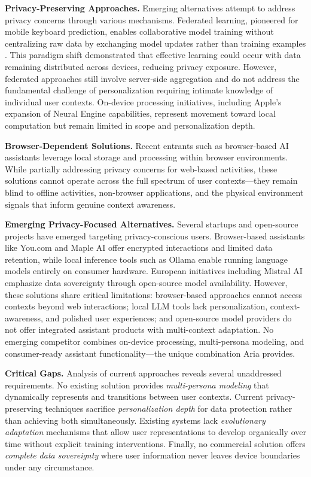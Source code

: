 \documentclass[11pt]{article}
\begin{document}
\textbf{Privacy-Preserving Approaches.} Emerging alternatives attempt to address privacy concerns through various mechanisms. Federated learning, pioneered for mobile keyboard prediction, enables collaborative model training without centralizing raw data by exchanging model updates rather than training examples \cite{mcmahan2017communication}. This paradigm shift demonstrated that effective learning could occur with data remaining distributed across devices, reducing privacy exposure. However, federated approaches still involve server-side aggregation and do not address the fundamental challenge of personalization requiring intimate knowledge of individual user contexts. On-device processing initiatives, including Apple's expansion of Neural Engine capabilities, represent movement toward local computation but remain limited in scope and personalization depth.

\textbf{Browser-Dependent Solutions.} Recent entrants such as browser-based AI assistants leverage local storage and processing within browser environments. While partially addressing privacy concerns for web-based activities, these solutions cannot operate across the full spectrum of user contexts---they remain blind to offline activities, non-browser applications, and the physical environment signals that inform genuine context awareness.

\textbf{Emerging Privacy-Focused Alternatives.} Several startups and open-source projects have emerged targeting privacy-conscious users. Browser-based assistants like You.com and Maple AI offer encrypted interactions and limited data retention, while local inference tools such as Ollama enable running language models entirely on consumer hardware. European initiatives including 
Mistral AI emphasize data sovereignty through open-source model availability. 
However, these solutions share critical limitations: browser-based approaches cannot access contexts beyond web interactions; local LLM tools lack personalization, context-awareness, and polished user experiences; and open-source model providers do not offer integrated assistant products with multi-context adaptation. No emerging competitor combines on-device processing, multi-persona modeling, and consumer-ready assistant functionality---the 
unique combination Aria provides.

\textbf{Critical Gaps.} Analysis of current approaches reveals several unaddressed requirements. No existing solution provides \textit{multi-persona modeling} that dynamically represents and transitions between user contexts. Current privacy-preserving techniques sacrifice \textit{personalization depth} for data protection rather than achieving both simultaneously. Existing systems lack \textit{evolutionary adaptation} mechanisms that allow user representations to develop organically over time without explicit training interventions. Finally, no commercial solution offers \textit{complete data sovereignty} where user information never leaves device boundaries under any circumstance.
\end{document}
